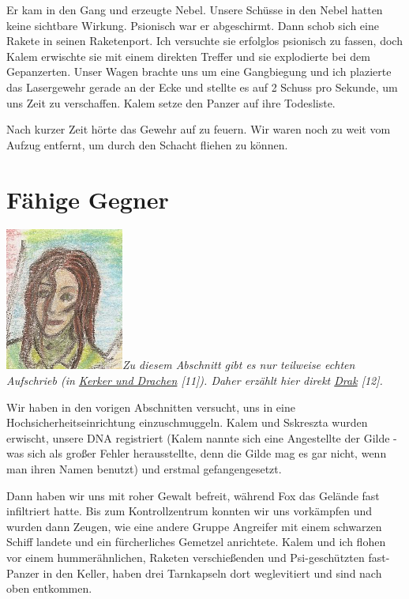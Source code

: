 \documentclass[11pt]{article}
\begin{document}
Er kam in den Gang und erzeugte Nebel. Unsere Schüsse in den Nebel
hatten keine sichtbare Wirkung. Psionisch war er abgeschirmt. Dann schob
sich eine Rakete in seinen Raketenport. Ich versuchte sie erfolglos
psionisch zu fassen, doch Kalem erwischte sie mit einem direkten Treffer
und sie explodierte bei dem Gepanzerten. Unser Wagen brachte uns um eine
Gangbiegung und ich plazierte das Lasergewehr gerade an der Ecke und
stellte es auf 2 Schuss pro Sekunde, um uns Zeit zu verschaffen. Kalem
setze den Panzer auf ihre Todesliste.

Nach kurzer Zeit hörte das Gewehr auf zu feuern. Wir waren noch zu weit
vom Aufzug entfernt, um durch den Schacht fliehen zu können.

\section{Fähige Gegner}

\includegraphics{sskreszta-portrait-alt-klein.png}\emph{Zu diesem
Abschnitt gibt es nur teilweise echten Aufschrieb (in
\href{http://1w6.org/deutsch/kampagnen/waechter-der-zeit/gedaechtniskristall/kerker-und-drachen}{Kerker
und Drachen} {[}11{]}). Daher erzählt hier direkt
\href{http://1w6.org/uzanto/drak}{Drak} {[}12{]}.}

Wir haben in den vorigen Abschnitten versucht, uns in eine
Hochsicherheitseinrichtung einzuschmuggeln. Kalem und Sskreszta wurden
erwischt, unsere DNA registriert (Kalem nannte sich eine Angestellte der
Gilde - was sich als großer Fehler herausstellte, denn die Gilde mag es
gar nicht, wenn man ihren Namen benutzt) und erstmal gefangengesetzt.

Dann haben wir uns mit roher Gewalt befreit, während Fox das Gelände
fast infiltriert hatte. Bis zum Kontrollzentrum konnten wir uns
vorkämpfen und wurden dann Zeugen, wie eine andere Gruppe Angreifer mit
einem schwarzen Schiff landete und ein fürcherliches Gemetzel
anrichtete. Kalem und ich flohen vor einem hummerähnlichen, Raketen
verschießenden und Psi-geschützten fast-Panzer in den Keller, haben drei
Tarnkapseln dort weglevitiert und sind nach oben entkommen.
\end{document}
